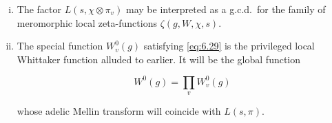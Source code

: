 \begin{remark}
\begin{enumerate}[(i)]
for some (exponential) function $\varepsilon(\psi_v, s)$ which is independent of $s$. (Here $\overline{\psi}_v = \psi_v^{-1} =$ the ``contragredient'' of the representation $\psi_v$.) In fact some straightforward computation shows that

\begin{equation}\label{eq:6.34}
L(s, \psi_v) = (1 - \psi_v(\tilde{\omega})q^{-s})^{-1}\tag{6.34}
\end{equation}

if $\psi_v$ is unramified and

\begin{equation}\label{eq:6.35}
L(s, \psi_v) \equiv 1\tag{6.35}
\end{equation}

otherwise. In either case

\begin{equation}\label{eq:6.36}
L(s, \psi_v) = \zeta(f_v, \psi_v, s)\tag{6.36}
\end{equation}

for an appropriate choice of $f_v$ and the analogy between this situation and the situation for $\GL(2)$ described by Theorem~\ref{thm:6.12} is immediate.

For the record,

\[
\varepsilon(\psi, s) \equiv 1
\]

if $\psi$ is unramified and

\[
\varepsilon(\psi, s) = (\text{root of unity})\, q^{\operatorname{cond}(\psi)(\frac{1}{2} - s)}
\]

in general.

\item The factor $L(s, \chi \otimes \pi_v)$ may be interpreted as a g.c.d.\ for the family of meromorphic local zeta-functions $\zeta(g, W, \chi, s)$.

\item The special function $W_v^0(g)$ satisfying \eqref{eq:6.29} is the privileged local Whittaker function alluded to earlier. It will be the global function

\begin{equation}\label{eq:6.37}
W^0(g) = \prod_v W_v^0(g)\tag{6.37}
\end{equation}

whose adelic Mellin transform will coincide with $L(s,\pi)$.

\end{enumerate}

\end{remark}

